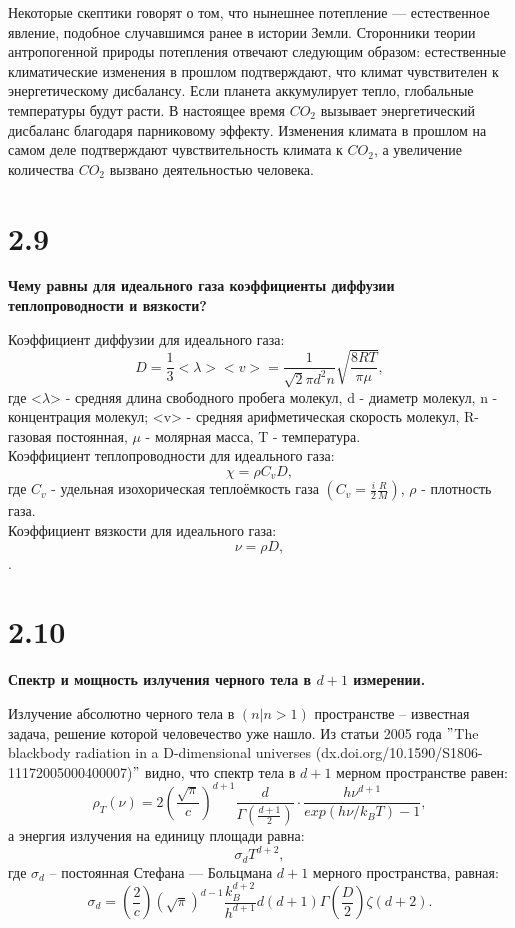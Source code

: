 \documentclass[a4paper,14pt]{article}
\begin{document}
Некоторые скептики говорят о том, что нынешнее потепление --- естественное явление, подобное случавшимся ранее в истории Земли. Сторонники теории антропогенной природы потепления отвечают следующим образом: естественные климатические изменения в прошлом подтверждают, что климат чувствителен к энергетическому дисбалансу. Если планета аккумулирует тепло, глобальные температуры будут расти. В настоящее время $CO_{2}$ вызывает энергетический дисбаланс благодаря парниковому эффекту. Изменения климата в прошлом на самом деле подтверждают чувствительность климата к $CO_{2}$, а увеличение количества $CO_{2}$ вызвано деятельностью человека.
\newline

\section*{2.9}
\begin{center}
	\LARGE{\textbf{Чему равны для идеального газа коэффициенты диффузии теплопроводности и вязкости?}}
\end{center}	
Коэффициент диффузии для идеального газа: \[ D=\frac{1}{3}<\lambda><v>=\frac{1}{\sqrt{2} \pi d^2 n} \sqrt{\frac{8 R T}{\pi \mu}},\] где <$\lambda$> - средняя длина свободного пробега молекул, d - диаметр молекул, n - концентрация молекул; <v> - средняя арифметическая скорость молекул, R-газовая постоянная, $\mu$ - молярная масса, T - температура.
\\Коэффициент теплопроводности для идеального газа: \[ \chi=\rho C_{v} D,\] где $C_{v}$ - удельная изохорическая теплоёмкость газа $(C_{v}=\frac{i}{2}\frac{R}{M})$, $\rho$ - плотность газа.
\\Коэффициент вязкости для идеального газа: \[\nu=\rho D,\].

\section*{2.10}
\begin{center}
	\LARGE{\textbf{Спектр и мощность излучения черного тела в $d + 1$ измерении.}}
\end{center}
Излучение абсолютно черного тела в $(n|n > 1)$ пространстве -- известная задача, решение которой человечество уже нашло. Из статьи 2005 года $"$The blackbody radiation in a D-dimensional universes (dx.doi.org/10.1590/S1806-11172005000400007)$"$ видно, что спектр тела в $d+1$ мерном пространстве равен:
\begin{equation*}
	\rho_T(\nu) = 2 \left( \frac{\sqrt{\pi}}{c} \right) ^{d + 1} \frac{d}{\Gamma \left( \frac{d + 1}{2} \right)}\cdot\frac{h\nu^{d + 1}}{exp(h\nu / k_B T) - 1},
\end{equation*}
а энергия излучения на единицу площади равна:
\begin{equation*}
	\sigma_d T^{d + 2},
\end{equation*}
где $\sigma_d$ -- постоянная Стефана — Больцмана $d + 1$ мерного пространства, равная:
\begin{equation*}
	\sigma_d = \left( \frac{2}{c} \right) (\sqrt{\pi})^{d - 1} \frac{k_B^{d+2}}{h^{d + 1}} d (d + 1) \Gamma \left( \frac{D}{2} \right) \zeta(d + 2).
\end{equation*}
\end{document}
